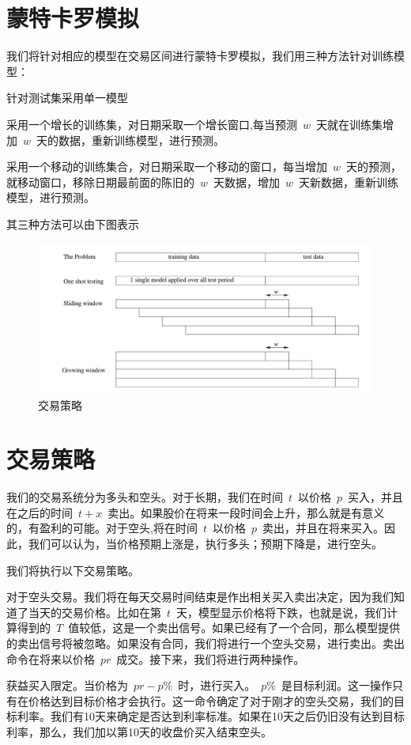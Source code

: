 \documentclass{article}\usepackage[]{graphicx}\usepackage[]{color}
\begin{document}
\begin{CJK*}{UTF8}{gkai}
\section{蒙特卡罗模拟}
我们将针对相应的模型在交易区间进行蒙特卡罗模拟，我们用三种方法针对训练模型：

\textbullet 针对测试集采用单一模型

\textbullet 采用一个增长的训练集，对日期采取一个增长窗口,每当预测~$w$~天就在训练集增加~$w$~天的数据，重新训练模型，进行预测。

\textbullet 采用一个移动的训练集合，对日期采取一个移动的窗口，每当增加~$w$~天的预测，就移动窗口，移除日期最前面的陈旧的~$w$~天数据，增加~$w$~天新数据，重新训练模型，进行预测。

其三种方法可以由下图表示
\begin{figure}[ht]
\centering
\includegraphics[width = 12cm]{./method.jpeg}
\caption{交易策略}
\end{figure}
\section{交易策略}
我们的交易系统分为多头和空头。对于长期，我们在时间~$t$~以价格~$p$~买入，并且在之后的时间~$t+x$~卖出。如果股价在将来一段时间会上升，那么就是有意义的，有盈利的可能。对于空头,将在时间~$t$~以价格~$p$~卖出，并且在将来买入。因此，我们可以认为，当价格预期上涨是，执行多头；预期下降是，进行空头。

我们将执行以下交易策略。

对于空头交易。我们将在每天交易时间结束是作出相关买入卖出决定，因为我们知道了当天的交易价格。比如在第~$t$~天，模型显示价格将下跌，也就是说，我们计算得到的~$T$~值较低，这是一个卖出信号。如果已经有了一个合同，那么模型提供的卖出信号将被忽略。如果没有合同，我们将进行一个空头交易，进行卖出。卖出命令在将来以价格~$pr$~成交。接下来，我们将进行两种操作。

\textbullet 获益买入限定。当价格为~$pr-p\%$~时，进行买入。~$p\%$~是目标利润。这一操作只有在价格达到目标价格才会执行。这一命令确定了对于刚才的空头交易，我们的目标利率。我们有10天来确定是否达到利率标准。如果在10天之后仍旧没有达到目标利率，那么，我们加以第10天的收盘价买入结束空头。


\end{CJK*}
\end{document}
